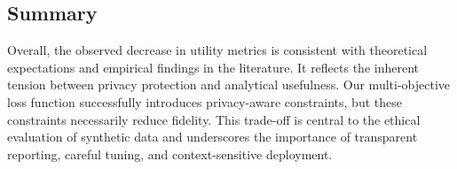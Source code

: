 \documentclass[11pt]{article}
\begin{document}
\subsection{Summary}

Overall, the observed decrease in utility metrics is consistent with theoretical expectations and empirical findings in the literature. It reflects the inherent tension between privacy protection and analytical usefulness. Our multi-objective loss function successfully introduces privacy-aware constraints, but these constraints necessarily reduce fidelity. This trade-off is central to the ethical evaluation of synthetic data and underscores the importance of transparent reporting, careful tuning, and context-sensitive deployment.




\end{document}
